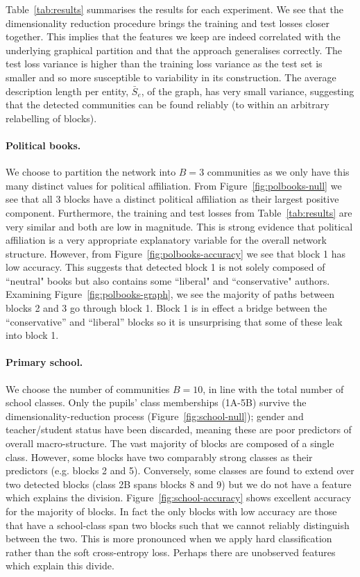 Table~\ref{tab:results} summarises the results for each experiment. 
We see that the dimensionality reduction procedure 
brings the training and test losses closer together. This implies that 
the features we keep are indeed correlated with the underlying graphical 
partition and that the approach generalises correctly. The test loss variance is higher than the training loss variance as the test set is smaller and so more susceptible to variability in its construction.
%
The average description length per entity,
$\bar{S}_e$, of the graph, 
has very small variance, suggesting that
the detected communities can be found reliably (to within an arbitrary 
relabelling of blocks).

\paragraph{\textbf{Political books.}}

We choose to partition the network into $B=3$ communities as we only have this many distinct values for political affiliation.
From Figure~\ref{fig:polbooks-null} we see that all 3 blocks have a distinct political affiliation as their largest positive component.  
Furthermore, the training and test losses from Table~\ref{tab:results}  
are very similar and both are low in magnitude. This is strong evidence 
that political affiliation is a very appropriate explanatory 
variable for the overall network structure.
%
However, from Figure~\ref{fig:polbooks-accuracy} we see that block 1 has low accuracy. 
This suggests that detected block 1 is not solely composed of ``neutral" books but also 
contains some ``liberal" and ``conservative" authors. Examining 
Figure~\ref{fig:polbooks-graph}, we see the majority of paths between blocks 2 and 3 go through block 1.
Block 1 is in effect a bridge between the ``conservative'' and ``liberal'' blocks so it is unsurprising that some of these leak into block 1.

\paragraph{\textbf{Primary school.}}

We choose the number of communities $B=10$, in line with the total number of 
school classes. Only the pupils' class memberships (1A-5B) survive
the dimensionality-reduction process (Figure~\ref{fig:school-null});
gender and teacher/student status have been discarded,
meaning these are poor predictors of overall macro-structure.
%
The vast majority of blocks are composed of a single class. 
However, some blocks have two comparably strong classes as their predictors (e.g. blocks 2 and 5). 
Conversely, some classes are found to extend over two 
detected blocks (class 2B spans blocks 8 and 9) but we do 
not have a feature which explains the division.
%
Figure~\ref{fig:school-accuracy} shows excellent accuracy for the majority of blocks. In fact the only blocks with low accuracy are those that have a school-class span two blocks such that we cannot reliably distinguish between the two. This is more pronounced when we apply hard classification rather than the soft cross-entropy loss. Perhaps there are unobserved features which explain this divide.

